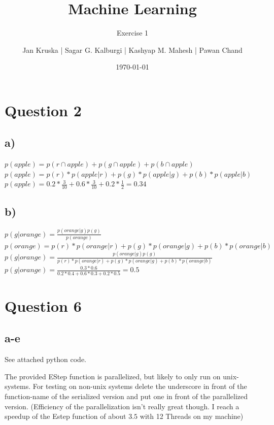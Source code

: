 \documentclass{scrartcl}
\begin{document}
	
	\title{Machine Learning}
	\subtitle{Exercise 1}
	\author{Jan Kruska | Sagar G. Kalburgi | Kashyap M. Mahesh | Pawan Chand}
	\date{\today}
	
	\maketitle
	
	\section*{Question 2}
	\subsection*{a)}
	$p(apple) = p(r\cap apple) + p(g\cap apple) + p(b\cap apple)$ \\
	$p(apple) = p(r) * p(apple|r) + p(g) * p(apple|g) + p(b) * p(apple|b)$ \\
	$p(apple) = 0.2 * \frac{3}{10} + 0.6 * \frac{3}{10} + 0.2 * \frac{1}{2} = 0.34 $
	
	\subsection*{b)}
	$p(g|orange) = \frac{p(orange|g)p(g)}{p(orange)}$ \\
	$p(orange) = p(r) * p(orange|r) + p(g) * p(orange|g) + p(b) * p(orange|b)$ \\
	$p(g|orange) = \frac{p(orange|g)p(g)}{p(r) * p(orange|r) + p(g) * p(orange|g) + p(b) * p(orange|b)}$ \\
	$p(g|orange) = \frac{0.3*0.6}{0.2*0.4 + 0.6*0.3 + 0.2*0.5} = 0.5$ \\
	
	
	\section*{Question 6}
	\subsection*{a-e}
	See attached python code.
	
	The provided EStep function is parallelized, but likely to only run on unix-systems. For testing on non-unix systems delete the underscore in front of the function-name of the serialized version and put one in front of the parallelized version.
	(Efficiency of the parallelization isn't really great though. I reach a speedup of the Estep function of about $3.5$ with 12 Threads on my machine)
	
\end{document}
